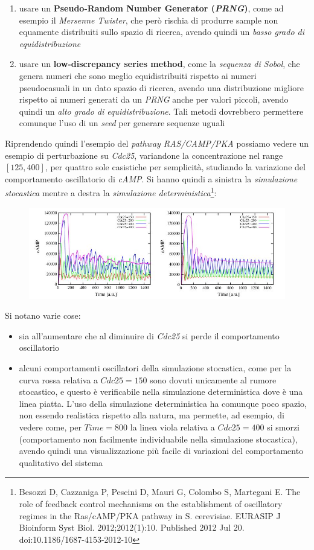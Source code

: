 \documentclass[a4paper,12pt, oneside]{book}
\begin{document}
\begin{enumerate}
  \item usare un \textbf{Pseudo-Random Number Generator (\textit{PRNG})}, come
  ad esempio il \textit{Mersenne Twister}, che però rischia di produrre sample
  non equamente distribuiti sullo spazio di ricerca, avendo quindi un
  \textit{basso grado di equidistribuzione}
  \item usare un \textbf{low-discrepancy series method}, come la
  \textit{sequenza di Sobol}, che genera numeri che
  sono meglio equidistribuiti rispetto ai numeri pseudocasuali in un dato spazio
  di ricerca, avendo una distribuzione migliore rispetto ai numeri generati da
  un \textit{PRNG} anche per valori piccoli, avendo quindi un \textit{alto
    grado
    di equidistribuzione}. Tali metodi dovrebbero permettere comunque l'uso di
  un \textit{seed} per generare sequenze uguali
\end{enumerate}
Riprendendo quindi l'esempio del \textit{pathway RAS/CAMP/PKA} possiamo vedere
un esempio di perturbazione su \textit{Cdc25}, variandone la concentrazione nel
range $[125,400]$, per quattro sole casistiche per semplicità, studiando la
variazione del comportamento oscillatorio di \textit{cAMP}. Si hanno quindi a 
sinistra la \textit{simulazione stocastica} mentre a destra la
\textit{simulazione deterministica}\footnote{Besozzi D, Cazzaniga P, Pescini D, 
  Mauri G, 
  Colombo S, Martegani E. The role of feedback control mechanisms on the
  establishment of oscillatory regimes in the Ras/cAMP/PKA pathway in
  S. cerevisiae. EURASIP J Bioinform Syst Biol. 2012;2012(1):10. Published 2012
  Jul 20. doi:10.1186/1687-4153-2012-10}:
\begin{figure}[H]
  \centering
  \includegraphics[scale = 0.5]{img/glucosimu2.jpg}
\end{figure}
Si notano varie cose:
\begin{itemize}
  \item sia all'aumentare che al diminuire di \textit{Cdc25} si perde il
  comportamento oscillatorio
  \item alcuni comportamenti oscillatori della simulazione stocastica, come per
  la curva rossa relativa a $Cdc25=150$ sono dovuti unicamente al rumore
  stocastico, e questo è verificabile nella simulazione deterministica dove è
  una linea piatta. L'uso della simulazione deterministica ha comunque poco
  spazio, non essendo realistica rispetto alla natura, ma permette, ad esempio,
  di vedere come, per $Time=800$ la linea viola relativa a $Cdc25=400$ si smorzi
  (comportamento non facilmente individuabile nella simulazione stocastica),
  avendo quindi una visualizzazione più facile di variazioni del comportamento
  qualitativo del sistema
\end{itemize}
\end{document}

